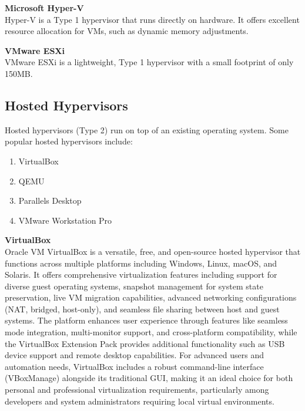 \documentclass[12pt]{article}
\begin{document}
\begin{spacing}{1.5}
\begin{adjustwidth}{0cm}{0cm}
\begin{justify}
\textbf{Microsoft Hyper-V} \\
Hyper-V is a Type 1 hypervisor that runs directly on hardware. It offers excellent
resource allocation for VMs, such as dynamic memory adjustments.

\textbf{VMware ESXi} \\
VMware ESXi is a lightweight, Type 1 hypervisor with a small footprint of only
150MB.

\subsection{Hosted Hypervisors}
Hosted hypervisors (Type 2) run on top of an existing operating system. Some popular
hosted hypervisors include:
\begin{enumerate}
    \item VirtualBox
    \item QEMU
    \item Parallels Desktop
    \item VMware Workstation Pro
\end{enumerate}

\textbf{VirtualBox} \\
Oracle VM VirtualBox is a versatile, free, and open-source hosted hypervisor that functions across multiple platforms including Windows, Linux, macOS, and Solaris. It offers comprehensive virtualization features including support for diverse guest operating systems, snapshot management for system state preservation, live VM migration capabilities, advanced networking configurations (NAT, bridged, host-only), and seamless file sharing between host and guest systems. The platform enhances user experience through features like seamless mode integration, multi-monitor support, and cross-platform compatibility, while the VirtualBox Extension Pack provides additional functionality such as USB device support and remote desktop capabilities. For advanced users and automation needs, VirtualBox includes a robust command-line interface (VBoxManage) alongside its traditional GUI, making it an ideal choice for both personal and professional virtualization requirements, particularly among developers and system administrators requiring local virtual environments.


\end{justify}
\end{adjustwidth}
\end{spacing}
\end{document}
